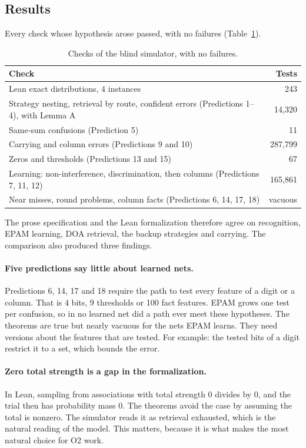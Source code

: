 \documentclass[11pt]{article}
\begin{document}
\subsection{Results}

Every check whose hypothesis arose passed, with no failures (Table~\ref{tab:results}).

\begin{table}[h]
\centering
\begin{tabularx}{\linewidth}{@{}Xr@{}}
\toprule
Check & Tests \\
\midrule
Lean exact distributions, 4 instances & 243 \\
Strategy nesting, retrieval by route, confident errors (Predictions 1--4), with Lemma A & 14{,}320 \\
Same-sum confusions (Prediction 5) & 11 \\
Carrying and column errors (Predictions 9 and 10) & 287{,}799 \\
Zeros and thresholds (Predictions 13 and 15) & 67 \\
Learning: non-interference, discrimination, then columns (Predictions 7, 11, 12) & 165{,}861 \\
Near misses, round problems, column facts (Predictions 6, 14, 17, 18) & vacuous \\
\bottomrule
\end{tabularx}
\caption{Checks of the blind simulator, with no failures.}
\label{tab:results}
\end{table}

The prose specification and the Lean formalization therefore agree on recognition, EPAM learning, DOA retrieval, the backup strategies and carrying. The comparison also produced three findings.

\paragraph{Five predictions say little about learned nets.} Predictions 6, 14, 17 and 18 require the path to test every feature of a digit or a column. That is 4 bits, 9 thresholds or 100 fact features. EPAM grows one test per confusion, so in no learned net did a path ever meet these hypotheses. The theorems are true but nearly vacuous for the nets EPAM learns. They need versions about the features that are tested. For example: the tested bits of a digit restrict it to a set, which bounds the error.

\paragraph{Zero total strength is a gap in the formalization.} In Lean, sampling from associations with total strength 0 divides by 0, and the trial then has probability mass 0. The theorems avoid the case by assuming the total is nonzero. The simulator reads it as retrieval exhausted, which is the natural reading of the model. This matters, because it is what makes the most natural choice for O2 work.
\end{document}
